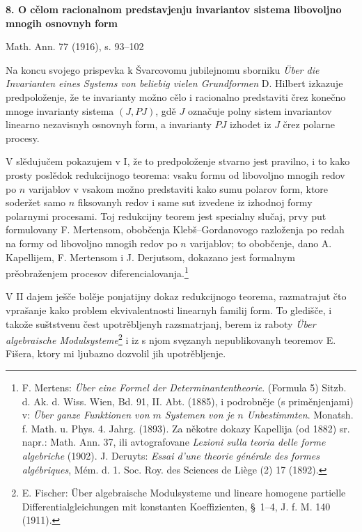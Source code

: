 \documentclass[11pt]{article}
\begin{document}
\begin{center}
{\Large\bfseries 8. O cělom racionalnom predstavjenju invariantov sistema libovoljno mnogih osnovnyh form}\par
\vspace{1.2em}
Math. Ann. 77 (1916), s. 93--102
\end{center}

\vspace{1em}

Na koncu svojego prispevka k Švarcovomu jubilejnomu sborniku \emph{Über die Invarianten eines Systems von beliebig vielen Grundformen} D. Hilbert izkazuje predpoloženje, že te invarianty možno cělo i racionalno predstaviti črez konečno mnoge invarianty sistema $(J,PJ)$, gdě $J$ označuje polny sistem invariantov linearno nezavisnyh osnovnyh form, a invarianty $PJ$ izhodet iz $J$ črez polarne procesy.

V slědujučem pokazujem v I, že to predpoloženje stvarno jest pravilno, i to kako prosty poslědok redukcijnogo teorema: vsaku formu od libovoljno mnogih redov po $n$ varijablov v vsakom možno predstaviti kako sumu polarov form, ktore soderžet samo $n$ fiksovanyh redov i same sut izvedene iz izhodnoj formy polarnymi procesami. Toj redukcijny teorem jest specialny slučaj, prvy put formulovany F. Mertensom, obobčenja Klebš--Gordanovogo razloženja po redah na formy od libovoljno mnogih redov po $n$ varijablov; to obobčenje, dano A. Kapellijem, F. Mertensom i J. Derjutsom, dokazano jest formalnym prěobraženjem procesov diferencialovanja.\footnote{F. Mertens: \emph{Über eine Formel der Determinantentheorie}. (Formula 5) Sitzb. d. Ak. d. Wiss. Wien, Bd. 91, II. Abt. (1885), i podrobněje (s priměnjenjami) v: \emph{Über ganze Funktionen von $m$ Systemen von je $n$ Unbestimmten}. Monatsh. f. Math. u. Phys. 4. Jahrg. (1893). Za někotre dokazy Kapellija (od 1882) sr. napr.: Math. Ann. 37, ili avtografovane \emph{Lezioni sulla teoria delle forme algebriche} (1902). J. Deruyts: \emph{Essai d'une theorie générale des formes algébriques}, Mém. d. 1. Soc. Roy. des Sciences de Liège (2) 17 (1892).}

V II dajem ješče bolěje ponjatijny dokaz redukcijnogo teorema, razmatrajut čto vprašanje kako problem ekvivalentnosti linearnyh familij form. To gledišče, i takože suštstvenu čest upotrěbljenyh razsmatrjanj, berem iz raboty \emph{Über algebraische Modulsysteme}\footnote{E. Fischer: Über algebraische Modulsysteme und lineare homogene partielle Differentialgleichungen mit konstanten Koeffizienten, \S\ 1--4, J. f. M. 140 (1911).} i iz s njom svęzanyh nepublikovanyh teoremov E. Fišera, ktory mi ljubazno dozvolil jih upotrěbljenje.
\end{document}
